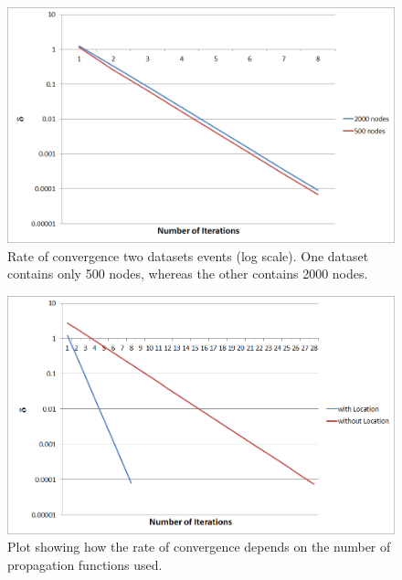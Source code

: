 \begin{figure}[h]
\centering
\includegraphics[width=\textwidth]{media/chapter6/conv/comparison.png}
\caption{Rate of convergence two datasets events (log scale). One dataset contains only 500 nodes, whereas the other contains 2000 nodes.}
\label{fig:convergences-comparison}
\end{figure}

\begin{figure}[h]
\centering
\includegraphics[width=\textwidth]{media/chapter6/conv/functions.png}
\caption{Plot showing how the rate of convergence depends on the number of propagation functions used.}
\label{fig:convergences-functions}
\end{figure}

